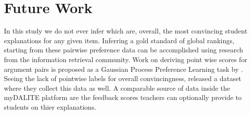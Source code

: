 \documentclass[runningheads]{llncs}
\begin{document}
\section{Future Work}
In this study we do not ever infer which are, overall, the most convincing 
student explanations for any given item. Inferring a gold standard of global 
rankings, starting from these pairwise preference data can be accomplished 
using research from the information retrieval 
community\cite{chen_pairwise_2013}. Work on deriving point wise scores for 
argument pairs is proposed as a Gaussian Process Preference Learning task by 
\cite{simpson_finding_2018}. Seeing the lack of pointwise labels for overall 
convincingness, \cite{toledo_automatic_2019} released a dataset where they 
collect this data as well. A comparable source of data inside the myDALITE 
platform are the feedback scores teachers can optionally provide to students on 
thier explanations.


 
 
\end{document}
